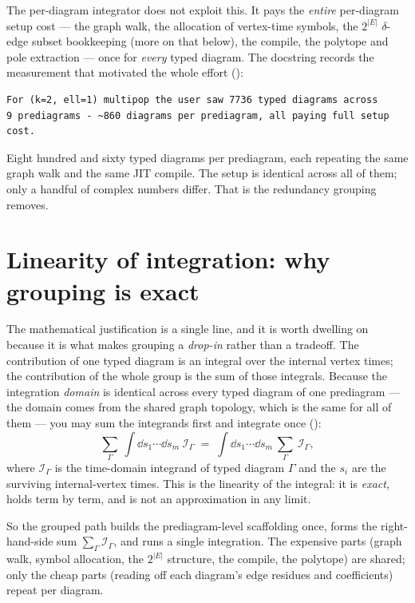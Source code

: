 The per-diagram integrator does not exploit this. It pays the \emph{entire}
per-diagram setup cost --- the graph walk, the allocation of vertex-time symbols,
the $2^{|E|}$ $\delta$-edge subset bookkeeping (more on that below), the
 compile, the polytope and pole extraction --- once for
\emph{every} typed diagram. The docstring records the measurement that motivated
the whole effort ():

\begin{lstlisting}[style=console]
For (k=2, ell=1) multipop the user saw 7736 typed diagrams across
9 prediagrams - ~860 diagrams per prediagram, all paying full setup
cost.
\end{lstlisting}

Eight hundred and sixty typed diagrams per prediagram, each repeating the same
graph walk and the same JIT compile. The setup is identical across all of them;
only a handful of complex numbers differ. That is the redundancy grouping
removes.

\section{Linearity of integration: why grouping is exact}

The mathematical justification is a single line, and it is worth dwelling on
because it is what makes grouping a \emph{drop-in} rather than a tradeoff. The
contribution of one typed diagram is an integral over the internal vertex times;
the contribution of the whole group is the sum of those integrals. Because the
integration \emph{domain} is identical across every typed diagram of one
prediagram --- the domain comes from the shared graph topology, which is the same
for all of them --- you may sum the integrands first and integrate once
():
\begin{equation}
  \sum_{\Gamma}\ \int \dd s_1 \cdots \dd s_m\ \mathcal{I}_\Gamma
  \;=\;
  \int \dd s_1 \cdots \dd s_m\ \sum_{\Gamma}\ \mathcal{I}_\Gamma ,
  \label{eq:linearity}
\end{equation}
where $\mathcal{I}_\Gamma$ is the time-domain integrand of typed diagram
$\Gamma$ and the $s_i$ are the surviving internal-vertex times. This is the
linearity of the integral: it is \emph{exact}, holds term by term, and is not an
approximation in any limit.

So the grouped path builds the prediagram-level scaffolding once, forms the
right-hand-side sum $\sum_\Gamma \mathcal{I}_\Gamma$, and runs a single
integration. The expensive parts (graph walk, symbol allocation, the
$2^{|E|}$ structure, the compile, the polytope) are shared; only the cheap parts
(reading off each diagram's edge residues and coefficients) repeat per diagram.

